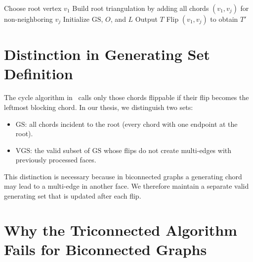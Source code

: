 \documentclass[12pt,a4paper]{report}
\theoremstyle{definition}
\theoremstyle{remark}
\newcommand{\GS}{\mathrm{GS}}
\newcommand{\VGS}{\mathrm{VGS}}
\begin{document}
\begin{algorithm}[H]
\caption{EnumerateCycleTriangulations}
\label{alg:cycle}
\begin{algorithmic}[1]
    \State Choose root vertex $v_1$
    \State Build root triangulation by adding all chords $(v_1,v_j)$ for non-neighboring $v_j$
    \State Initialize $\GS$, $O$, and $L$
    \State {}
\EndProcedure
\Statex
{}
    \State Output $T$
            \State Flip $(v_1,v_j)$ to obtain $T'$
            \State {}
        \EndFor
    \EndIf
\EndProcedure
\end{algorithmic}
\end{algorithm}

\chapter{Distinction in Generating Set Definition}
\label{chap:gsdistinction}

The cycle algorithm in~\cite{parvez2011} calls only those chords flippable if their flip
becomes the leftmost blocking chord. In our thesis, we distinguish two sets:
\begin{itemize}[leftmargin=2em]
    \item $\GS$: all chords incident to the root (every chord with one endpoint at the root).
    \item $\VGS$: the valid subset of $\GS$ whose flips do not create multi-edges with
          previously processed faces.
\end{itemize}
This distinction is necessary because in biconnected graphs a generating chord may lead
to a multi-edge in another face. We therefore maintain a separate valid generating set
that is updated after each flip.

\chapter{Why the Triconnected Algorithm Fails for Biconnected Graphs}
\label{chap:triconnected}
\end{document}
